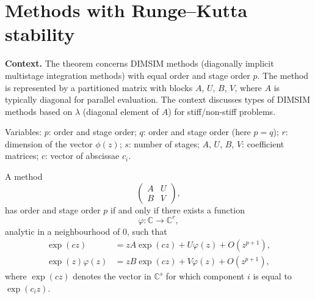 \section{Methods with Runge–Kutta stability}

\noindent\textbf{Context.}
The theorem concerns DIMSIM methods (diagonally implicit multistage integration methods) with equal order and stage order $p$. The method is represented by a partitioned matrix with blocks $A$, $U$, $B$, $V$, where $A$ is typically diagonal for parallel evaluation. The context discusses types of DIMSIM methods based on $\lambda$ (diagonal element of $A$) for stiff/non-stiff problems.

Variables: $p$: order and stage order; $q$: order and stage order (here $p = q$); $r$: dimension of the vector $\phi(z)$; $s$: number of stages; $A$, $U$, $B$, $V$: coefficient matrices; $c$: vector of abscissae $c_i$.

\begin{theorem}

  \label{thm:541A}
A method
\[
\begin{pmatrix}
A & U \\
B & V
\end{pmatrix},
\]
has order and stage order $p$ if and only if there exists a function
\[
\varphi : \mathbb{C} \to \mathbb{C}^{r},
\]
analytic in a neighbourhood of $0$, such that
\begin{align}
\exp(cz) &= zA \exp(cz) + U \varphi(z) + O(z^{p+1}), \label{eq:541a} \\
\exp(z)\varphi(z) &= zB \exp(cz) + V \varphi(z) + O(z^{p+1}), \label{eq:541b}
\end{align}
where $\exp(cz)$ denotes the vector in $\mathbb{C}^{s}$ for which component $i$ is equal to $\exp(c_i z)$.
\end{theorem}

